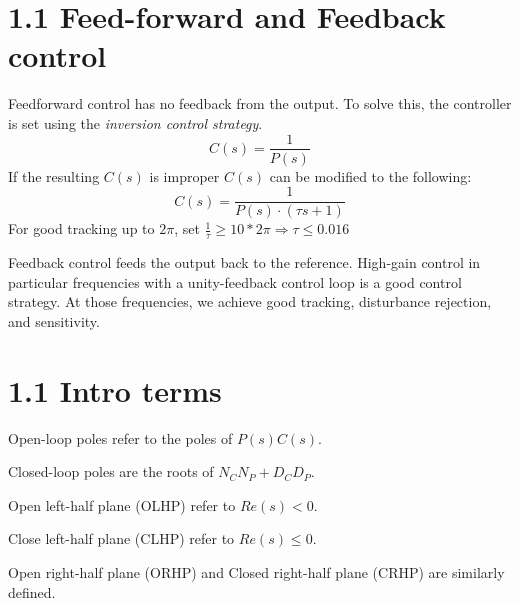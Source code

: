 \section*{1.1 Feed-forward and Feedback control}

Feedforward control has no feedback from the output.
To solve this, the controller is set using the \textit{inversion control strategy}.
\begin{equation*}
    C(s) = \frac{ 1 }{ P(s) }
\end{equation*}
If the resulting \( C(s) \) is improper \( C(s) \) can be modified to the following:
\begin{equation*}
    C(s) = \frac{1}{ P(s) \cdot (\tau s + 1) }
\end{equation*}
For good tracking up to \(2\pi\), set \( \frac{1}{\tau} \geq 10 * 2\pi \Rightarrow \tau \leq 0.016 \)

Feedback control feeds the output back to the reference.
High-gain control in particular frequencies with a unity-feedback control loop is a good control strategy.
At those frequencies, we achieve good tracking, disturbance rejection, and sensitivity.

\section*{1.1 Intro terms}

Open-loop poles refer to the poles of \( P(s) C(s) \).

Closed-loop poles are the roots of \( N_C N_P + D_C D_P \).

Open left-half plane (OLHP) refer to \( Re(s) < 0 \).

Close left-half plane (CLHP) refer to \( Re(s) \leq 0 \).

Open right-half plane (ORHP) and Closed right-half plane (CRHP) are similarly defined.

